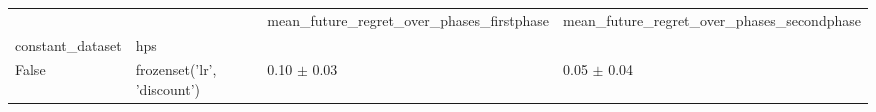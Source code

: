\begin{tabular}{llll}
\toprule
 &  & mean_future_regret_over_phases_firstphase & mean_future_regret_over_phases_secondphase \\
constant_dataset & hps &  &  \\
\midrule
False & frozenset({'lr', 'discount'}) & 0.10 $\pm$ 0.03 & 0.05 $\pm$ 0.04 \\
\cline{1-4}
\bottomrule
\end{tabular}
